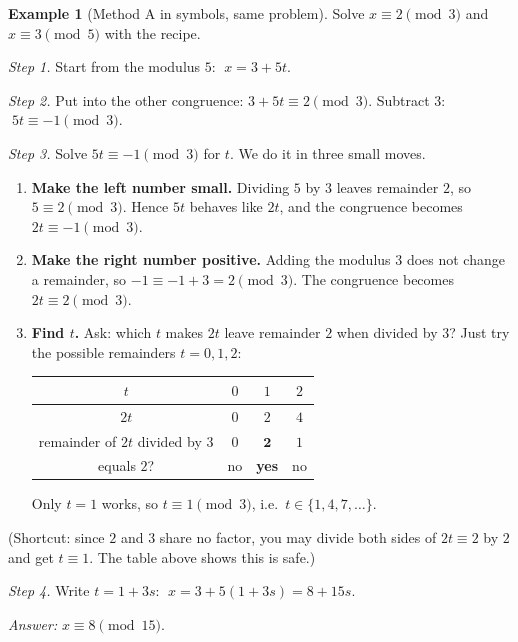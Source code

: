 \documentclass[11pt]{article}
\theoremstyle{definition}
\newtheorem{example}[theorem]{Example}
\theoremstyle{remark}
\begin{document}
\begin{example}[Method A in symbols, same problem]\label{ex:qs-sub2}
Solve $x\equiv 2\pmod 3$ and $x\equiv 3\pmod 5$ with the recipe.

\emph{Step 1.} Start from the modulus $5$: $\;x=3+5t$.

\emph{Step 2.} Put into the other congruence: $3+5t\equiv 2\pmod 3$. Subtract $3$: $\;5t\equiv -1\pmod 3$.

\emph{Step 3.} Solve $5t\equiv -1\pmod 3$ for $t$. We do it in three small moves.

\begin{enumerate}[label=(\alph*),leftmargin=2em,itemsep=2pt]
\item \textbf{Make the left number small.} Dividing $5$ by $3$ leaves remainder $2$, so $5\equiv2\pmod 3$. Hence $5t$ behaves like $2t$, and the congruence becomes $2t\equiv-1\pmod 3$.
\item \textbf{Make the right number positive.} Adding the modulus $3$ does not change a remainder, so $-1\equiv-1+3=2\pmod 3$. The congruence becomes $2t\equiv2\pmod 3$.
\item \textbf{Find $t$.} Ask: which $t$ makes $2t$ leave remainder $2$ when divided by $3$? Just try the possible remainders $t=0,1,2$:
\begin{center}
\begin{tabular}{cccc}
\toprule
$t$ & $0$ & $1$ & $2$ \\
\midrule
$2t$ & $0$ & $2$ & $4$ \\
remainder of $2t$ divided by $3$ & $0$ & $\mathbf{2}$ & $1$ \\
equals $2$? & no & \textbf{yes} & no \\
\bottomrule
\end{tabular}
\end{center}
Only $t=1$ works, so $t\equiv1\pmod 3$, i.e.\ $t\in\{1,4,7,\dots\}$.
\end{enumerate}

(Shortcut: since $2$ and $3$ share no factor, you may divide both sides of $2t\equiv2$ by $2$ and get $t\equiv1$. The table above shows this is safe.)

\emph{Step 4.} Write $t=1+3s$: $\;x=3+5(1+3s)=8+15s$.

\emph{Answer:} $x\equiv 8\pmod{15}$.
\end{example}
\end{document}
